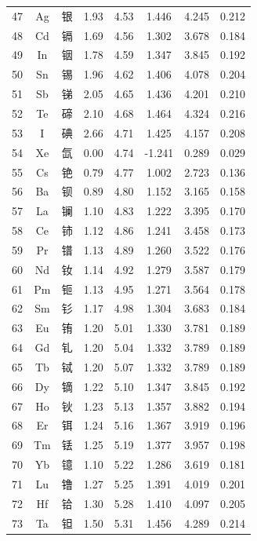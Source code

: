 \documentclass[11pt,a4paper]{article}
\begin{document}
\begin{longtable}{|c|c|p{2.5cm}|c|c|c|c|c|}
		47 & Ag & 银 & 1.93 & 4.53 & 1.446  & 4.245  & 0.212 \\
		48 & Cd & 镉 & 1.69 & 4.56 & 1.302  & 3.678  & 0.184 \\
		49 & In & 铟 & 1.78 & 4.59 & 1.347  & 3.845  & 0.192 \\
		50 & Sn & 锡 & 1.96 & 4.62 & 1.406  & 4.078  & 0.204 \\
		51 & Sb & 锑 & 2.05 & 4.65 & 1.436  & 4.201  & 0.210 \\
		52 & Te & 碲 & 2.10 & 4.68 & 1.464  & 4.324  & 0.216 \\
		53 & I  & 碘 & 2.66 & 4.71 & 1.425  & 4.157  & 0.208 \\
		54 & Xe & 氙 & 0.00 & 4.74 & -1.241 & 0.289  & 0.029 \\
		55 & Cs & 铯 & 0.79 & 4.77 & 1.002  & 2.723  & 0.136 \\
		56 & Ba & 钡 & 0.89 & 4.80 & 1.152  & 3.165  & 0.158 \\
		57 & La & 镧 & 1.10 & 4.83 & 1.222  & 3.395  & 0.170 \\
		58 & Ce & 铈 & 1.12 & 4.86 & 1.241  & 3.458  & 0.173 \\
		59 & Pr & 镨 & 1.13 & 4.89 & 1.260  & 3.522  & 0.176 \\
		60 & Nd & 钕 & 1.14 & 4.92 & 1.279  & 3.587  & 0.179 \\
		61 & Pm & 钷 & 1.13 & 4.95 & 1.271  & 3.564  & 0.178 \\
		62 & Sm & 钐 & 1.17 & 4.98 & 1.304  & 3.683  & 0.184 \\
		63 & Eu & 铕 & 1.20 & 5.01 & 1.330  & 3.781  & 0.189 \\
		64 & Gd & 钆 & 1.20 & 5.04 & 1.332  & 3.789  & 0.189 \\
		65 & Tb & 铽 & 1.20 & 5.07 & 1.332  & 3.789  & 0.189 \\
		66 & Dy & 镝 & 1.22 & 5.10 & 1.347  & 3.845  & 0.192 \\
		67 & Ho & 钬 & 1.23 & 5.13 & 1.357  & 3.882  & 0.194 \\
		68 & Er & 铒 & 1.24 & 5.16 & 1.367  & 3.919  & 0.196 \\
		69 & Tm & 铥 & 1.25 & 5.19 & 1.377  & 3.957  & 0.198 \\
		70 & Yb & 镱 & 1.10 & 5.22 & 1.286  & 3.619  & 0.181 \\
		71 & Lu & 镥 & 1.27 & 5.25 & 1.391  & 4.019  & 0.201 \\
		72 & Hf & 铪 & 1.30 & 5.28 & 1.410  & 4.097  & 0.205 \\
		73 & Ta & 钽 & 1.50 & 5.31 & 1.456  & 4.289  & 0.214 \\

\end{longtable}
\end{document}

